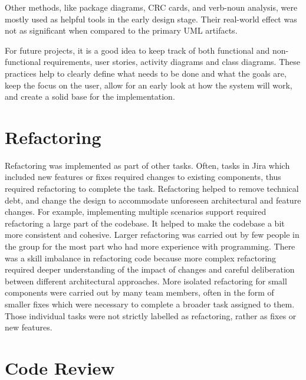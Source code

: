 Other methods, like package diagrams, CRC cards, and verb-noun analysis, were mostly used as helpful tools in the early design stage. Their real-world effect was not as significant when compared to the primary UML artifacts.\par

For future projects, it is a good idea to keep track of both functional and non-functional requirements, user stories, activity diagrams and class diagrams. These practices help to clearly define what needs to be done and what the goals are, keep the focus on the user, allow for an early look at how the system will work, and create a solid base for the implementation.\par

\section{Refactoring}

Refactoring was implemented as part of other tasks. Often, tasks in Jira which included new features or fixes required changes to existing components, thus required refactoring to complete the task. Refactoring helped to remove technical debt, and change the design to accommodate unforeseen architectural and feature changes. For example, implementing multiple scenarios support required refactoring a large part of the codebase. It helped to make the codebase a bit more consistent and cohesive. Larger refactoring was carried out by few people in the group for the most part who had more experience with programming. There was a skill imbalance in refactoring code because more complex refactoring required deeper understanding of the impact of changes and careful deliberation between different architectural approaches. More isolated refactoring for small components were carried out by many team members, often in the form of smaller fixes which were necessary to complete a broader task assigned to them. Those individual tasks were not strictly labelled as refactoring, rather as fixes or new features.

\section{Code Review}

